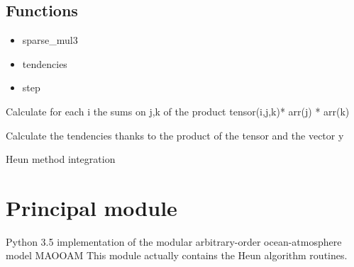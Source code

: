 \documentclass[letterpaper,10pt,english]{sphinxmanual}
\begin{document}
\section{Functions}
\label{rstfiles/integrator:functions}\begin{itemize}
\item {} 
sparse\_mul3

\item {} 
tendencies

\item {} 
step

\end{itemize}

\begin{fulllineitems}
\label{rstfiles/integrator:integrator.sparse_mul3}
Calculate for each i the sums on j,k of the product
tensor(i,j,k)* arr(j) * arr(k)

\end{fulllineitems}


\begin{fulllineitems}
\label{rstfiles/integrator:integrator.tendencies}
Calculate the tendencies thanks to the product of the tensor and the vector y

\end{fulllineitems}


\begin{fulllineitems}
\label{rstfiles/integrator:integrator.step}
Heun method integration

\end{fulllineitems}

\label{rstfiles/maooam:module-maooam}

\chapter{Principal module}
\label{rstfiles/maooam:principal-module}\label{rstfiles/maooam::doc}
Python 3.5 implementation of the modular arbitrary-order ocean-atmosphere model MAOOAM
This module actually contains the Heun algorithm routines.
\end{document}

